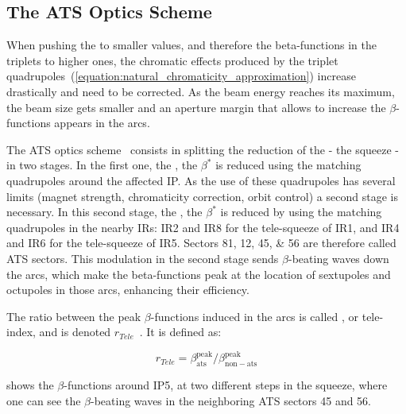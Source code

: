 \subsection{The ATS Optics Scheme}
\label{subsection:lhc_ats_optics_scheme}

When pushing the  to smaller values, and therefore the \glspl{beta-function} in the triplets to higher ones, the chromatic effects produced by the triplet quadrupoles~(\cref{equation:natural_chromaticity_approximation}) increase drastically and need to be corrected.
As the beam energy reaches its maximum, the beam size gets smaller and an aperture margin that allows to increase the \(\beta\)-functions appears in the arcs.

The \gls{ATS} optics scheme~\cite{CERN:Fartoukh:ATS_Report,PRAB:Fartoukh:Achromatic_Telescopic_Squeeze,IPAC:Pojer:LHC_ATS_Experience} consists in splitting the reduction of the  - the squeeze - in two stages.
In the first one, the , the \(\beta^{\ast}\) is reduced using the matching quadrupoles around the affected IP.
As the use of these quadrupoles has several limits (magnet strength, chromaticity correction, orbit control) a second stage is necessary.
In this second stage, the , the \(\beta^{\ast}\) is reduced by using the matching quadrupoles in the nearby IRs: IR\num{2} and IR\num{8} for the tele-squeeze of IR\num{1}, and IR\num{4} and IR\num{6} for the tele-squeeze of IR\num{5}.
Sectors \numlist{81;12;45;56} are therefore called ATS sectors.
This modulation in the second stage sends \(\beta\)-beating waves down the arcs, which make the \glspl{beta-function} peak at the location of sextupoles and octupoles in those arcs, enhancing their efficiency.

The ratio between the peak \(\beta\)-functions induced in the arcs is called , or tele-index, and is denoted \(r_{Tele}\)~\cite{CERN:Fartoukh:Round_Telescopic_Optics_LHC_Large_Telescopic_Index}.
It is defined as:

\begin{equation}
  r_{Tele} = \beta^{\mathrm{peak}}_{\mathrm{ats}} / \beta^{\mathrm{peak}}_{\mathrm{non-ats}}
  \label{equation:tele_index}
\end{equation}

 shows the \(\beta\)-functions around IP\num{5}, at two different steps in the squeeze, where one can see the \(\beta\)-beating waves in the neighboring ATS sectors \num{45} and \num{56}.

